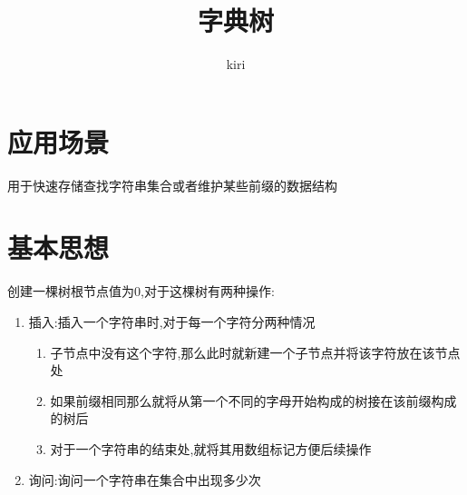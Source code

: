 \documentclass{ctexart}
\title{字典树}
\author{kiri}
\begin{document}
\maketitle
\section{应用场景}
用于快速存储查找字符串集合或者维护某些前缀的数据结构
\section{基本思想}
创建一棵树根节点值为0,对于这棵树有两种操作:
\begin{enumerate}
    \item 插入:插入一个字符串时,对于每一个字符分两种情况
    \begin{enumerate}
        \item 子节点中没有这个字符,那么此时就新建一个子节点并将该字符放在该节点处
        \item 如果前缀相同那么就将从第一个不同的字母开始构成的树接在该前缀构成的树后
        \item 对于一个字符串的结束处,就将其用数组标记方便后续操作
    \end{enumerate}
    \item 询问:询问一个字符串在集合中出现多少次
\end{enumerate}
\end{document}
